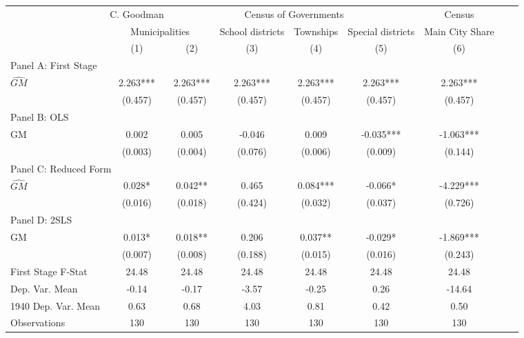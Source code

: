  \begin{tabular}{l*{8}{c}} \toprule
&\multicolumn{1}{c}{C. Goodman}&\multicolumn{4}{c}{Census of Governments}&\multicolumn{1}{c}{Census}\\\cmidrule(lr){2-2}\cmidrule(lr){3-6}\cmidrule(lr){7-7}
&\multicolumn{2}{c}{Municipalities}&\multicolumn{1}{c}{School districts}&\multicolumn{1}{c}{Townships}&\multicolumn{1}{c}{Special districts}&\multicolumn{1}{c}{Main City Share}\\\cmidrule(lr){2-3}\cmidrule(lr){4-6}\cmidrule(lr){7-7}
&\multicolumn{1}{c}{(1)}&\multicolumn{1}{c}{(2)}&\multicolumn{1}{c}{(3)}&\multicolumn{1}{c}{(4)}&\multicolumn{1}{c}{(5)}&\multicolumn{1}{c}{(6)}\\
\cmidrule(lr){1-7}
\multicolumn{6}{l}{Panel A: First Stage}\\
\cmidrule(lr){1-7}
$\widehat{GM}$  &    2.263***&    2.263***&    2.263***&    2.263***&    2.263***&    2.263***\\
                &  (0.457)   &  (0.457)   &  (0.457)   &  (0.457)   &  (0.457)   &  (0.457)   \\
\cmidrule(lr){1-7}
\multicolumn{6}{l}{Panel B: OLS}\\
\cmidrule(lr){1-7}
GM              &    0.002   &    0.005   &   -0.046   &    0.009   &   -0.035***&   -1.063***\\
                &  (0.003)   &  (0.004)   &  (0.076)   &  (0.006)   &  (0.009)   &  (0.144)   \\
\cmidrule(lr){1-7}
\multicolumn{6}{l}{Panel C: Reduced Form}\\
\cmidrule(lr){1-7}
$\widehat{GM}$  &    0.028*  &    0.042** &    0.465   &    0.084***&   -0.066*  &   -4.229***\\
                &  (0.016)   &  (0.018)   &  (0.424)   &  (0.032)   &  (0.037)   &  (0.726)   \\
\cmidrule(lr){1-7}
\multicolumn{6}{l}{Panel D: 2SLS}\\
\cmidrule(lr){1-7}
GM              &    0.013*  &    0.018** &    0.206   &    0.037** &   -0.029*  &   -1.869***\\
                &  (0.007)   &  (0.008)   &  (0.188)   &  (0.015)   &  (0.016)   &  (0.243)   \\
\midrule
First Stage F-Stat&    24.48   &    24.48   &    24.48   &    24.48   &    24.48   &    24.48   \\
Dep. Var. Mean  &    -0.14   &    -0.17   &    -3.57   &    -0.25   &     0.26   &   -14.64   \\
1940 Dep. Var. Mean&     0.63   &     0.68   &     4.03   &     0.81   &     0.42   &     0.50   \\
Observations    &      130   &      130   &      130   &      130   &      130   &      130   \\
       \bottomrule \end{tabular}
